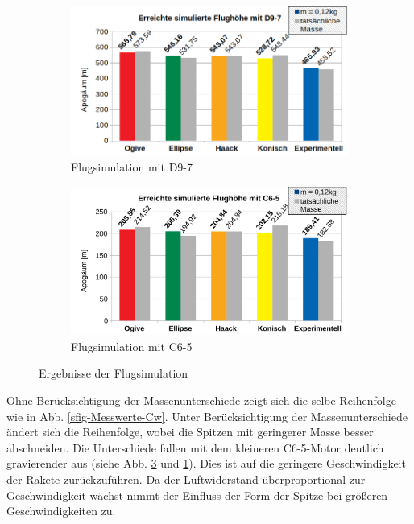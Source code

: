 \documentclass[10pt,a4paper]{article}
\begin{document}
\begin{figure}[h]
\begin{subfigure}[l]{0.49\textwidth}
	\centering
	\includegraphics[width=\textwidth]{Bilder/Flugsimulation-D9-7.png}
	\caption{Flugsimulation mit \textsf{D9-7}}
	\label{sfig-Flugsimulation-D9-7}
\end{subfigure}
\begin{subfigure}[r]{0.49\textwidth}
	\centering
	\includegraphics[width=\textwidth]{Bilder/Flugsimulation-C6-5.png}
	\caption{Flugsimulation mit \textsf{C6-5}}
	\label{sfig-Flugsimulation-C6-5}
\end{subfigure}
\caption{Ergebnisse der Flugsimulation}
\end{figure}

\noindent
Ohne Berücksichtigung der Massenunterschiede zeigt sich die selbe Reihenfolge wie in Abb. \ref{sfig-Messwerte-Cw}. Unter Berücksichtigung der Massenunterschiede ändert sich die Reihenfolge, wobei die Spitzen mit geringerer Masse besser abschneiden. Die Unterschiede fallen mit dem kleineren \textsf{C6-5}-Motor deutlich gravierender aus (siehe Abb. \ref{sfig-Flugsimulation-C6-5} und \ref{sfig-Flugsimulation-D9-7}). Dies ist auf die geringere Geschwindigkeit der Rakete zurückzuführen. Da der Luftwiderstand überproportional zur Geschwindigkeit wächst nimmt der Einfluss der Form der Spitze bei größeren Geschwindigkeiten zu.
\end{document}
